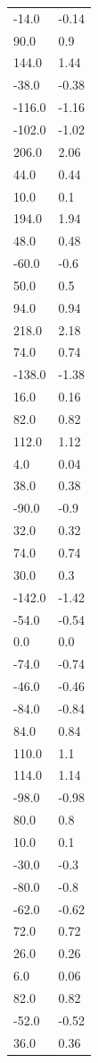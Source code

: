 \begin{longtable}{ll}
-14.0 & -0.14 \\
90.0 & 0.9 \\
144.0 & 1.44 \\
-38.0 & -0.38 \\
-116.0 & -1.16 \\
-102.0 & -1.02 \\
206.0 & 2.06 \\
44.0 & 0.44 \\
10.0 & 0.1 \\
194.0 & 1.94 \\
48.0 & 0.48 \\
-60.0 & -0.6 \\
50.0 & 0.5 \\
94.0 & 0.94 \\
218.0 & 2.18 \\
74.0 & 0.74 \\
-138.0 & -1.38 \\
16.0 & 0.16 \\
82.0 & 0.82 \\
112.0 & 1.12 \\
4.0 & 0.04 \\
38.0 & 0.38 \\
-90.0 & -0.9 \\
32.0 & 0.32 \\
74.0 & 0.74 \\
30.0 & 0.3 \\
-142.0 & -1.42 \\
-54.0 & -0.54 \\
0.0 & 0.0 \\
-74.0 & -0.74 \\
-46.0 & -0.46 \\
-84.0 & -0.84 \\
84.0 & 0.84 \\
110.0 & 1.1 \\
114.0 & 1.14 \\
-98.0 & -0.98 \\
80.0 & 0.8 \\
10.0 & 0.1 \\
-30.0 & -0.3 \\
-80.0 & -0.8 \\
-62.0 & -0.62 \\
72.0 & 0.72 \\
26.0 & 0.26 \\
6.0 & 0.06 \\
82.0 & 0.82 \\
-52.0 & -0.52 \\
36.0 & 0.36 \\

\end{longtable}
